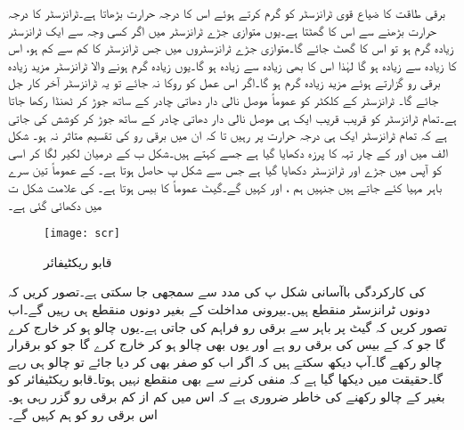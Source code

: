 برقی طاقت کا ضیاع قوی ٹرانزسٹر کو گرم کرتے ہوئے اس کا درجہ حرارت بڑھاتا ہے۔ٹرانزسٹر کا درجہ حرارت بڑھنے سے اس کا  گھٹتا ہے۔یوں متوازی جڑے ٹرانزسٹر میں اگر کسی وجہ سے ایک ٹرانزسٹر زیادہ گرم ہو تو اس کا  گھٹ جائے گا۔متوازی جڑے ٹرانزسٹروں میں جس ٹرانزسٹر کا  کم سے کم ہو، اس کا  زیادہ سے زیادہ ہو گا لہٰذا اس کا  بھی زیادہ سے زیادہ ہو گا۔یوں زیادہ گرم ہونے والا ٹرانزسٹر مزید زیادہ برقی رو گزارتے ہوئے مزید زیادہ گرم ہو گا۔اگر اس عمل کو روکا نہ جائے تو یہ ٹرانزسٹر آخر کار جل جائے گا۔ ٹرانزسٹر کے کلکٹر  کو عموماً موصل نالی دار دھاتی چادر کے ساتھ جوڑ کر ٹھنڈا رکھا جاتا ہے۔تمام ٹرانزسٹر کو قریب قریب ایک ہی موصل نالی دار دھاتی چادر کے ساتھ جوڑ کر کوشش کی جاتی ہے کہ تمام ٹرانزسٹر ایک ہی درجہ حرارت پر رہیں تا کہ ان میں برقی رو کی تقسیم متاثر نہ ہو۔
شکل  الف میں  اور  کے چار تہہ کا پرزہ دکھایا گیا ہے جسے  کہتے ہیں۔شکل  ب کے درمیان لکیر لگا کر اسی کو آپس میں جڑے  اور  ٹرانزسٹر دکھایا گیا ہے جس سے شکل  پ حاصل ہوتا ہے۔ کے عموماً تین سرے باہر مہیا کئے جاتے ہیں جنہیں ہم ،  اور  کہیں گے۔گیٹ عموماً  کا بیس ہوتا ہے۔ کی علامت شکل  ت میں دکھائی گئی ہے۔ 
\begin{figure}
\centering
\texttt{[image: scr]}
\caption{ قابو ریکٹیفائر}
\label{شکل_قابو_ریکٹیفائر}
\end{figure}

 کی کارکردگی باآسانی شکل  پ کی مدد سے سمجھی جا سکتی ہے۔تصور کریں کہ دونوں ٹرانزسٹر منقطع ہیں۔بیرونی مداخلت کے بغیر دونوں منقطع ہی رہیں گے۔اب تصور کریں کہ گیٹ پر باہر سے برقی رو  فراہم کی جاتی ہے۔یوں  چالو ہو کر  خارج کرے گا جو کہ   کے بیس کی برقی رو ہے اور یوں  بھی چالو ہو کر  خارج کرے گا جو  کو برقرار چالو رکھے گا۔آپ دیکھ سکتے ہیں کہ اگر اب  کو صفر  بھی کر دیا جائے تو  چالو ہی رہے گا۔حقیقت میں دیکھا گیا ہے کہ  منفی کرنے سے بھی  منقطع نہیں ہوتا۔قابو ریکٹیفائر کو بغیر  کے چالو رکھنے کی خاطر ضروری ہے کہ اس میں کم از کم  برقی رو گزر رہی ہو۔اس برقی رو کو ہم  کہیں گے۔

